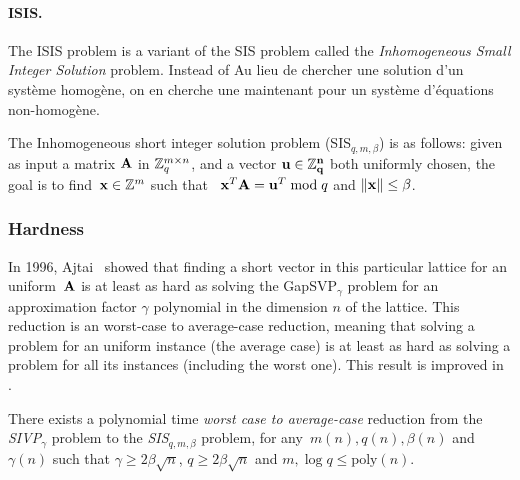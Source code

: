 \paragraph{ISIS.} The ISIS problem is a variant of the SIS problem called the \emph{Inhomogeneous Small Integer Solution} problem. Instead of 
 Au lieu de chercher une solution d'un système homogène, on en cherche une maintenant pour un système d'équations non-homogène.
 
\begin{definition}\label{def:ISIS}
The Inhomogeneous short integer solution problem (SIS$_{q,m,\beta}$) is as follows: given as input a matrix $\bf A$  in $\mathbb{Z}_q^{m \times n}$, and a vector $\bf{u} \in \mathbb{Z}_q^n$ both uniformly chosen, the goal is to find~${\bf x} \in \mathbb{Z}^{m}$ such that~ ${\bf x}^T {\bf A} = {\bf u}^T \bmod q$ and $\|{\bf x}\| \leq \beta $. 

\end{definition}


\subsubsection{Hardness}

In 1996, Ajtai~\cite{Ajtai96} showed that finding a short vector in this particular lattice for an uniform~$\bf A$ is at least as hard as solving the GapSVP$_{\gamma}$ problem for an approximation factor $\gamma$ polynomial in the dimension $n$ of the lattice.
This reduction is an worst-case to average-case reduction, meaning that solving a problem for an uniform instance (the average case) is at least as hard as solving a problem for all its instances (including the worst one). This result is improved in \cite{MR04,GPV08}.



\begin{theorem}
\label{th:GPV_SIS}\label{WCAV}
There exists a polynomial time \emph{worst case to average-case} reduction from the \emph{SIVP}$_{\gamma}$ problem to the \emph{SIS}$_{q,m,\beta}$ problem, for any~$m(n), q(n), \beta(n)$ and~$\gamma(n)$ such that $\gamma \geq 2 \beta \sqrt{n}$, $q \geq 2 \beta \sqrt{n}$ and $m,  \log q \leq \text{poly}(n)$.
\end{theorem}


